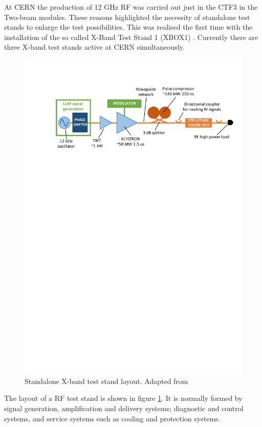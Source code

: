 At CERN the production of 12 GHz RF was carried out just in the CTF3 in the Two-beam modules. These reasons highlighted the necessity of standalone test stands to enlarge the test possibilities. This was realised the first time with the installation of the so called X-Band Test Stand 1 (XBOX1) \cite{Peauger:1287901}. Currently there are three X-band test stands active at CERN simultaneously.

\begin{figure}[h]
\centering 
\includegraphics[scale=0.8]{pictures/test_stand_scheme.pdf}
\caption{Standalone X-band test stand layout. Adapted from \cite{Woolley:2015}}
\label{xbox_layout}
\end{figure}

The layout of a RF test stand is shown in figure \ref{xbox_layout}. It is normally formed by signal generation, amplification and delivery systems; diagnostic and control systems, and service systems such as cooling and protection systems. 


